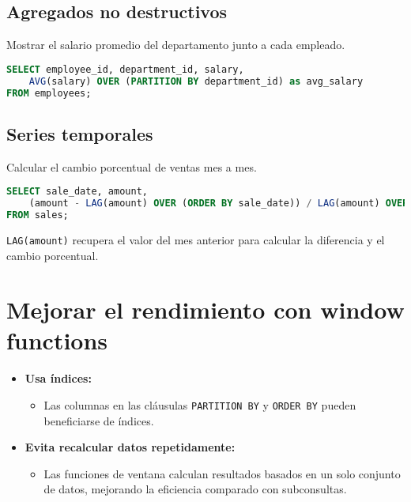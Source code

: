 \subsection{Agregados no destructivos}

Mostrar el salario promedio del departamento junto a cada empleado.

\begin{lstlisting}[language=SQL]
SELECT employee_id, department_id, salary,
    AVG(salary) OVER (PARTITION BY department_id) as avg_salary
FROM employees;
\end{lstlisting}

\subsection{Series temporales}

Calcular el cambio porcentual de ventas mes a mes.

\begin{lstlisting}[language=SQL]
SELECT sale_date, amount,
    (amount - LAG(amount) OVER (ORDER BY sale_date)) / LAG(amount) OVER (ORDER BY sale_date) * 100 AS pct_change
FROM sales;
\end{lstlisting}

\texttt{LAG(amount)} recupera el valor del mes anterior para calcular
la diferencia y el cambio porcentual.

\section{Mejorar el rendimiento con window functions}

\begin{itemize}
    \item \textbf{Usa índices:}
    \begin{itemize}
        \item Las columnas en las cláusulas \texttt{PARTITION BY} y \texttt{ORDER BY} pueden beneficiarse de índices.
    \end{itemize}
    \item \textbf{Evita recalcular datos repetidamente:}
    \begin{itemize}
        \item Las funciones de ventana calculan resultados basados en un
        solo conjunto de datos, mejorando la eficiencia comparado con subconsultas.
    \end{itemize}
\end{itemize}
